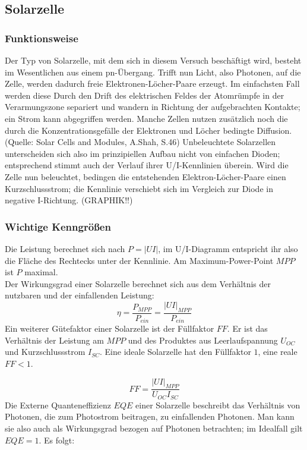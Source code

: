 \subsection{Solarzelle}
\subsubsection{Funktionsweise}
Der Typ von Solarzelle, mit dem sich in diesem Versuch beschäftigt wird, besteht im Wesentlichen aus einem pn-Übergang. Trifft nun Licht, also Photonen, auf die Zelle, werden dadurch freie Elektronen-Löcher-Paare erzeugt. Im einfachsten Fall werden diese Durch den Drift des elektrischen Feldes der Atomrümpfe in der Verarmungszone separiert und wandern in Richtung der aufgebrachten Kontakte; ein Strom kann abgegriffen werden. Manche Zellen nutzen zusätzlich noch die durch die Konzentrationsgefälle der Elektronen und Löcher bedingte Diffusion. (Quelle: Solar Cells and Modules, A.Shah, S.46) Unbeleuchtete Solarzellen unterscheiden sich also im prinzipiellen Aufbau nicht von einfachen Dioden; entsprechend stimmt auch der Verlauf ihrer U/I-Kennlinien überein. Wird die Zelle nun beleuchtet, bedingen die entstehenden Elektron-Löcher-Paare einen Kurzschlussstrom; die Kennlinie verschiebt sich im Vergleich zur Diode in negative I-Richtung. (GRAPHIK!!)

\subsubsection{Wichtige Kenngrößen}
Die Leistung berechnet sich nach $P = |UI|$, im U/I-Diagramm entspricht ihr also die Fläche des Rechtecks unter der Kennlinie. Am Maximum-Power-Point $MPP$ ist $P$ maximal. \\
Der Wirkungsgrad einer Solarzelle berechnet sich aus dem Verhältnis der nutzbaren und der einfallenden Leistung:
\begin{equation*}
\eta = \frac{P_{MPP}}{P_{ein}} = \frac{|UI|_{MPP}}{P_{ein}}
\end{equation*}
Ein weiterer Gütefaktor einer Solarzelle ist der Füllfaktor $FF$. Er ist das Verhältnis der Leistung am $MPP$ und des Produktes aus Leerlaufspannung $U_{OC}$ und Kurzschlussstrom $I_{SC}$. Eine ideale Solarzelle hat den Füllfaktor $1$, eine reale $FF < 1$.

\begin{equation*}
FF = \frac{|UI|_{MPP}}{U_{OC} I_{SC}}
\end{equation*}
Die Externe Quanteneffizienz $EQE$ einer Solarzelle beschreibt das Verhältnis von Photonen, die zum Photostrom beitragen, zu einfallenden Photonen. Man kann sie also auch als Wirkungsgrad bezogen auf Photonen betrachten; im Idealfall gilt $EQE = 1$. Es folgt:

